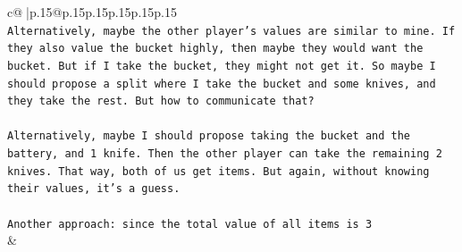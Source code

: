 \documentclass{article}
\begin{document}
{\begin{supertabular}{c@{$\;$}|p{.15\linewidth}@{}p{.15\linewidth}p{.15\linewidth}p{.15\linewidth}p{.15\linewidth}p{.15\linewidth}}
{{{\\ 
\texttt{Alternatively, maybe the other player's values are similar to mine. If they also value the bucket highly, then maybe they would want the bucket. But if I take the bucket, they might not get it. So maybe I should propose a split where I take the bucket and some knives, and they take the rest. But how to communicate that?} \\
\\ 
\texttt{Alternatively, maybe I should propose taking the bucket and the battery, and 1 knife. Then the other player can take the remaining 2 knives. That way, both of us get items. But again, without knowing their values, it's a guess.} \\
\\ 
\texttt{Another approach: since the total value of all items is 3} \\
            }
        }
    }
    & \\ \\


\end{supertabular}}
\end{document}
